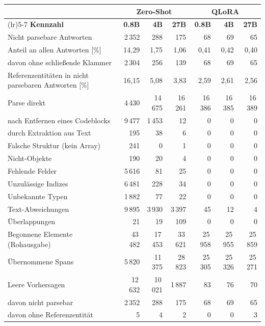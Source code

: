 \begin{tabular}{>{\raggedright\arraybackslash}p{5.8cm}rrrrrr}
    \toprule
    & \multicolumn{3}{c}{\textbf{Zero-Shot}} &
      \multicolumn{3}{c}{\textbf{QLoRA}} \\
    \cmidrule(lr){2-4}\cmidrule(lr){5-7}
    \textbf{Kennzahl} & \textbf{0.8B} & \textbf{4B} & \textbf{27B} &
      \textbf{0.8B} & \textbf{4B} & \textbf{27B} \\
    \midrule
    Nicht parsebare Antworten & 2\,352 & 288 & 175 & 68 & 69 & 65 \\
    \quad Anteil an allen Antworten [\%] & 14,29 & 1,75 & 1,06 & 0,41 & 0,42 & 0,40 \\
    \quad davon ohne schlie\ss{}ende Klammer & 2\,304 & 256 & 139 & 68 & 69 & 65 \\
    Referenzentit\"aten in nicht parsebaren Antworten [\%] & 16,15 & 5,08 & 3,83 & 2,59 & 2,61 & 2,56 \\
    Parse direkt & 4\,430 & 14\,675 & 16\,261 & 16\,386 & 16\,385 & 16\,389 \\
    \quad nach Entfernen eines Codeblocks & 9\,477 & 1\,453 & 12 & 0 & 0 & 0 \\
    \quad durch Extraktion aus Text & 195 & 38 & 6 & 0 & 0 & 0 \\
    Falsche Struktur (kein Array) & 241 & 0 & 1 & 0 & 0 & 0 \\
    Nicht-Objekte & 190 & 20 & 4 & 0 & 0 & 0 \\
    Fehlende Felder & 5\,616 & 81 & 25 & 0 & 0 & 0 \\
    Unzul\"assige Indizes & 6\,481 & 228 & 34 & 0 & 0 & 0 \\
    Unbekannte Typen & 1\,882 & 77 & 22 & 0 & 0 & 0 \\
    Text-Abweichungen & 9\,895 & 3\,930 & 3\,397 & 45 & 12 & 4 \\
    \"Uberlappungen & 21 & 19 & 109 & 0 & 0 & 0 \\
    Begonnene Elemente (Rohausgabe) & 43\,482 & 17\,453 & 33\,621 & 25\,958 & 25\,955 & 25\,859 \\
    \"Ubernommene Spans & 5\,820 & 11\,375 & 28\,823 & 25\,305 & 25\,326 & 25\,271 \\
    \midrule
    Leere Vorhersagen & 12\,632 & 10\,021 & 1\,887 & 83 & 76 & 70 \\
    \quad davon nicht parsebar & 2\,352 & 288 & 175 & 68 & 69 & 65 \\
    \quad davon ohne Referenzentit\"at & 5 & 4 & 2 & 0 & 0 & 3 \\
    \bottomrule
\end{tabular}
